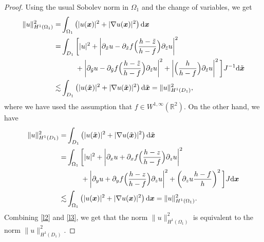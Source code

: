 \documentclass[final,leqno]{siamltex}
\begin{document}
\begin{proof}
Using the usual Sobolev norm in $\Omega_1$ and the change of variables, we get
\begin{align}\label{l2}
 \|u\|^2_{H^1 (\Omega_1)}
 =&\int_{\Omega_1} \left( |u (\boldsymbol x)|^2 + | \nabla u (\boldsymbol x)|^2
\right) {\rm d} \boldsymbol x \nonumber\\
 =&\int_{D_1} \bigg[ |u|^2 + \left|\partial_{\tilde x} u - \partial_{\tilde x}
f\Big(\frac {h-\tilde z}{h-f}\Big)  \partial_{\tilde z} u \right|^2 \nonumber\\
&\qquad+\left|\partial_{\tilde y}u - \partial_{\tilde y} f \Big(\frac{h - \tilde
z}{h-f}\Big) \partial_{\tilde z} u\right|^2+ \left|\Big(\frac{h}{h-f}\Big)
\partial_{\tilde z} u \right|^2 \bigg] J^{-1} {\rm d} \tilde{\boldsymbol x}
\nonumber\\
 \lesssim &  \int_{D_1} \left( |u (\tilde{\boldsymbol x})|^2 + |\nabla u
(\tilde{\boldsymbol x})|^2  \right){\rm d} \tilde{\boldsymbol x}=\|u\|^2_{H^1
(D_1)},
\end{align}
where we have used the assumption that $f\in W^{1, \infty}(\mathbb{R}^2)$. On
the other hand, we have
\begin{align}\label{l3}
 \|u \|^2_{H^1 (D_1)}
=& \int_{D_1} \left ( |u (\tilde{\boldsymbol x})|^2  + |\nabla u
(\tilde{\boldsymbol x})|^2 \right) {\rm d} \tilde{\boldsymbol x} \nonumber\\
 =& \int_{\Omega_1 } \bigg[ |u|^2  + \left|\partial_x u
+\partial_x f\Big(\frac{h-z}{h-f}\Big) \partial_z u \right|^2\nonumber\\
&\qquad +\left| \partial_y u +\partial_y f\Big(\frac{h-z}{h-f}\Big) \partial_z u
\right|^2+ \left(\partial_z u \frac{h-f}{h} \right)^2\bigg]
 J{\rm d}\boldsymbol x \nonumber \\
  \lesssim & \int_{\Omega_1} \left(  |u (\boldsymbol x)|^2 + |\nabla
u(\boldsymbol x)|^2\right) { \rm d}\boldsymbol x=\|u\|^2_{H^1(\Omega_1)}.
\end{align}
Combining \eqref{l2} and \eqref{l3}, we get that the norm
$\|u\|^2_{H^1(\Omega_1)}$ is equivalent to the norm $\|u\|^2_{H^1(D_1)}$.


\end{proof}
\end{document}
